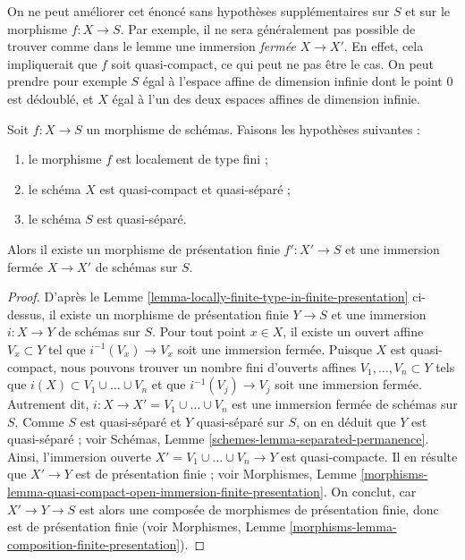 \begin{remark}
\label{remark-cannot-do-better}
On ne peut améliorer cet énoncé sans hypothèses supplémentaires sur $S$ et
sur le morphisme $f : X \to S$. Par exemple, il ne sera généralement pas
possible de trouver comme dans le lemme une immersion {\it fermée}
$X \to X'$. En effet, cela impliquerait que $f$ soit quasi-compact, ce qui
peut ne pas être le cas. On peut prendre pour exemple $S$ égal à l'espace
affine de dimension infinie dont le point $0$ est dédoublé, et $X$ égal à
l'un des deux espaces affines de dimension infinie.
\end{remark}

\begin{lemma}
\label{lemma-finite-type-closed-in-finite-presentation}
Soit $f : X \to S$ un morphisme de schémas. Faisons les hypothèses suivantes :
\begin{enumerate}
\item le morphisme $f$ est localement de type fini ;
\item le schéma $X$ est quasi-compact et quasi-séparé ;
\item le schéma $S$ est quasi-séparé.
\end{enumerate}
Alors il existe un morphisme de présentation finie $f' : X' \to S$ et une
immersion fermée $X \to X'$ de schémas sur $S$.
\end{lemma}

\begin{proof}
D'après le Lemme \ref{lemma-locally-finite-type-in-finite-presentation}
ci-dessus, il existe un morphisme de présentation finie $Y \to S$ et une
immersion $i : X \to Y$ de schémas sur $S$. Pour tout point $x \in X$, il
existe un ouvert affine $V_x \subset Y$ tel que
$i^{-1}(V_x) \to V_x$ soit une immersion fermée. Puisque $X$ est
quasi-compact, nous pouvons trouver un nombre fini d'ouverts affines
$V_1, \ldots, V_n \subset Y$ tels que
$i(X) \subset V_1 \cup \ldots \cup V_n$ et que
$i^{-1}(V_j) \to V_j$ soit une immersion fermée. Autrement dit,
$i : X \to X' = V_1 \cup \ldots \cup V_n$ est une immersion fermée de
schémas sur $S$. Comme $S$ est quasi-séparé et $Y$ quasi-séparé sur $S$, on
en déduit que $Y$ est quasi-séparé ; voir Schémas,
Lemme \ref{schemes-lemma-separated-permanence}. Ainsi, l'immersion ouverte
$X' = V_1 \cup \ldots \cup V_n \to Y$ est quasi-compacte. Il en résulte que
$X' \to Y$ est de présentation finie ; voir Morphismes,
Lemme \ref{morphisms-lemma-quasi-compact-open-immersion-finite-presentation}.
On conclut, car $X' \to Y \to S$ est alors une composée de morphismes de
présentation finie, donc est de présentation finie (voir Morphismes,
Lemme \ref{morphisms-lemma-composition-finite-presentation}).
\end{proof}

